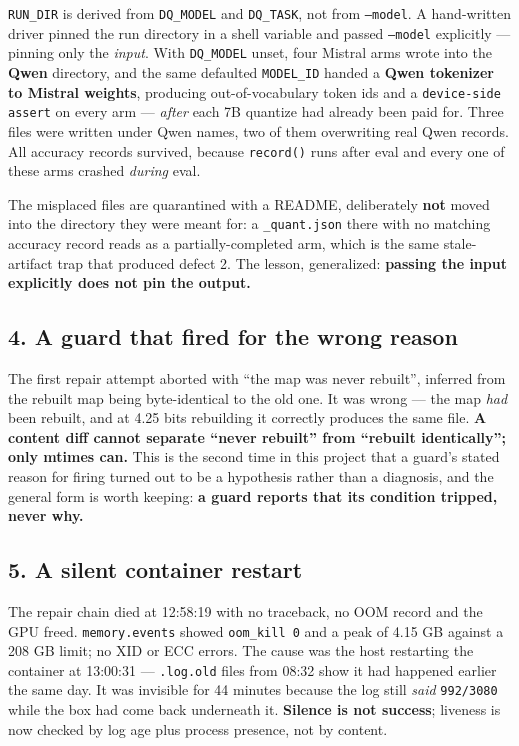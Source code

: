 \documentclass[11pt]{article}
\newcommand{\code}[1]{\texttt{#1}}
\begin{document}
\code{RUN\_DIR} is derived from \code{DQ\_MODEL} and \code{DQ\_TASK}, not from \code{--model}. A
hand-written driver pinned the run directory in a shell variable and passed \code{--model}
explicitly --- pinning only the \emph{input}. With \code{DQ\_MODEL} unset, four Mistral arms wrote
into the \textbf{Qwen} directory, and the same defaulted \code{MODEL\_ID} handed a \textbf{Qwen
tokenizer to Mistral weights}, producing out-of-vocabulary token ids and a \code{device-side
assert} on every arm --- \emph{after} each 7B quantize had already been paid for. Three files were
written under Qwen names, two of them overwriting real Qwen records. All accuracy records survived,
because \code{record()} runs after eval and every one of these arms crashed \emph{during} eval.

The misplaced files are quarantined with a README, deliberately \textbf{not} moved into the
directory they were meant for: a \code{\_quant.json} there with no matching accuracy record reads
as a partially-completed arm, which is the same stale-artifact trap that produced defect 2. The
lesson, generalized: \textbf{passing the input explicitly does not pin the output.}

\subsection*{4. A guard that fired for the wrong reason}

The first repair attempt aborted with ``the map was never rebuilt'', inferred from the rebuilt map
being byte-identical to the old one. It was wrong --- the map \emph{had} been rebuilt, and at 4.25
bits rebuilding it correctly produces the same file. \textbf{A content diff cannot separate ``never
rebuilt'' from ``rebuilt identically''; only mtimes can.} This is the second time in this project
that a guard's stated reason for firing turned out to be a hypothesis rather than a diagnosis, and
the general form is worth keeping: \textbf{a guard reports that its condition tripped, never why.}

\subsection*{5. A silent container restart}

The repair chain died at 12:58:19 with no traceback, no OOM record and the GPU freed.
\code{memory.events} showed \code{oom\_kill 0} and a peak of 4.15 GB against a 208 GB limit; no XID
or ECC errors. The cause was the host restarting the container at 13:00:31 --- \code{.log.old}
files from 08:32 show it had happened earlier the same day. It was invisible for 44 minutes because
the log still \emph{said} \code{992/3080} while the box had come back underneath it.
\textbf{Silence is not success}; liveness is now checked by log age plus process presence, not by
content.
\end{document}
